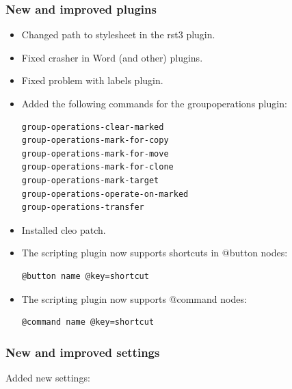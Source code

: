 \documentclass[a4paper,10pt,english]{sphinxmanual}
\begin{document}
\subsubsection{New and improved plugins}
\label{what-is-new:id29}\begin{itemize}
\item {} 
Changed path to stylesheet in the rst3 plugin.

\item {} 
Fixed crasher in Word (and other) plugins.

\item {} 
Fixed problem with labels plugin.

\item {} 
Added the following commands for the groupoperations plugin:

\begin{Verbatim}[commandchars=\\\{\}]
group-operations-clear-marked
group-operations-mark-for-copy
group-operations-mark-for-move
group-operations-mark-for-clone
group-operations-mark-target
group-operations-operate-on-marked
group-operations-transfer
\end{Verbatim}

\item {} 
Installed cleo patch.

\item {} 
The scripting plugin now supports shortcuts in @button nodes:

\begin{Verbatim}[commandchars=\\\{\}]
@button name @key=shortcut
\end{Verbatim}

\item {} 
The scripting plugin now supports @command nodes:

\begin{Verbatim}[commandchars=\\\{\}]
@command name @key=shortcut
\end{Verbatim}

\end{itemize}


\subsubsection{New and improved settings}
\label{what-is-new:new-and-improved-settings}
Added new settings:
\end{document}
